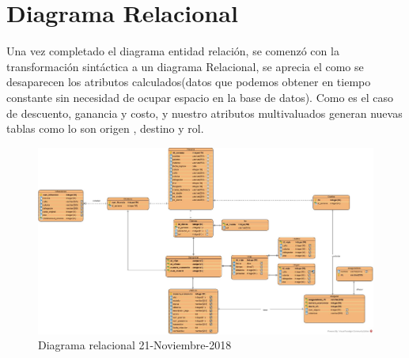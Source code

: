 \documentclass{article}
\begin{document}
\section {Diagrama Relacional}
Una vez completado el diagrama entidad relación, se comenzó con la transformación sintáctica a un diagrama Relacional, 
se aprecia el como se desaparecen los atributos calculados(datos que podemos obtener en tiempo constante sin necesidad de ocupar espacio en la base de datos).
Como es el caso de descuento, ganancia y costo, y nuestro atributos multivaluados generan nuevas tablas como lo son origen , destino y rol.\\
\begin{figure}[H]
\begin{center}
\includegraphics[width=5in]{./img/relacional.jpg}
\caption{Diagrama relacional 21-Noviembre-2018}
\end{center}
\end{figure}
\end{document}
